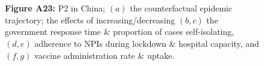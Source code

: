 \documentclass[paper=a4,fontsize=11pt]{article}
\begin{document}
\begin{figure}[!h]
  \\
  \hspace{1.76cm}
  \\
  \caption*{\textbf{Figure A23:} P2 in China; $(a)$ the counterfactual epidemic trajectory; the effects of increasing/decreasing $(b,c)$ the government response time \& proportion of cases self-isolating, $(d,e)$ adherence to NPIs during lockdown \& hospital capacity, and $(f,g)$ vaccine administration rate \& uptake.}
\end{figure}
\end{document}
